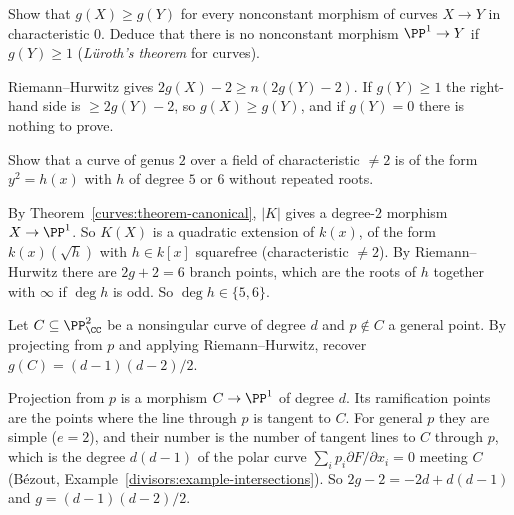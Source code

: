 \begin{exercise}\label{curves:exercise-no-rational}
Show that $g(X) \geq g(Y)$ for every nonconstant morphism of curves $X \to Y$ in characteristic $0$. Deduce that there is no nonconstant morphism $\PP^1 \to Y$ if
$g(Y) \geq 1$ (\emph{L\"uroth's theorem} for curves).
\end{exercise}

\begin{solution}
Riemann--Hurwitz gives
$2g(X) - 2 \geq n(2g(Y) - 2)$. If $g(Y) \geq 1$ the right-hand side is $\geq 2g(Y) - 2$, so $g(X) \geq g(Y)$, and if $g(Y) = 0$ there is nothing to prove.
\end{solution}

\begin{exercise}\label{curves:exercise-genus-two}
Show that a curve of genus $2$ over a field of characteristic $\neq 2$ is of the form $y^2 = h(x)$ with $h$ of degree $5$ or $6$ without repeated roots.
\end{exercise}

\begin{solution}
By Theorem~\ref{curves:theorem-canonical}, $|K|$ gives a degree-$2$ morphism $X \to \PP^1$. So $K(X)$ is a quadratic extension of $k(x)$, of the form $k(x)(\sqrt{h})$ with
$h \in k[x]$ squarefree (characteristic $\neq 2$). By Riemann--Hurwitz there are $2g + 2 = 6$ branch points, which are the roots of $h$ together with $\infty$ if $\deg h$ is odd.
So $\deg h \in \{5, 6\}$.
\end{solution}

\begin{exercise}\label{curves:exercise-plane-curve-genus-rh}
Let $C \subseteq \PP^2_\CC$ be a nonsingular curve of degree $d$ and $p \notin C$ a general point. By projecting from $p$ and applying Riemann--Hurwitz, recover $g(C) = (d-1)(d-2)/2$.
\end{exercise}

\begin{solution}
Projection from $p$ is a morphism $C \to \PP^1$ of degree $d$. Its ramification points are the points where the line through $p$ is tangent to $C$. For general $p$ they are simple
($e = 2$), and their number is the number of tangent lines to $C$ through $p$, which is the degree $d(d - 1)$ of the polar curve $\sum_ip_i\partial F/\partial x_i = 0$ meeting $C$
(B\'ezout, Example~\ref{divisors:example-intersections}). So $2g - 2 = -2d + d(d - 1)$ and $g = (d-1)(d-2)/2$.
\end{solution}
